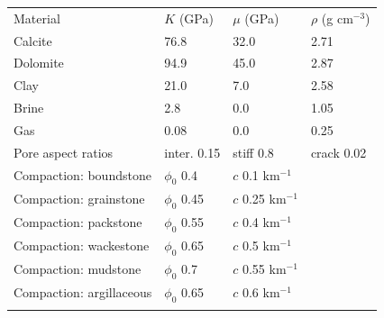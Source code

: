 \begin{tabular}{llll}
\tophline
Material & $K$ (GPa) & $\mu$ (GPa) & $\rho$ (g cm$^{-3}$) \\
\middlehline
Calcite & 76.8 & 32.0 & 2.71 \\
Dolomite & 94.9 & 45.0 & 2.87 \\
Clay & 21.0 & 7.0 & 2.58 \\
Brine & 2.8 & 0.0 & 1.05 \\
Gas & 0.08 & 0.0 & 0.25 \\
Pore aspect ratios & inter. 0.15 & stiff 0.8 & crack 0.02 \\
Compaction: boundstone & $\phi_0$ 0.4 & $c$ 0.1 km$^{-1}$ &  \\
Compaction: grainstone & $\phi_0$ 0.45 & $c$ 0.25 km$^{-1}$ &  \\
Compaction: packstone & $\phi_0$ 0.55 & $c$ 0.4 km$^{-1}$ &  \\
Compaction: wackestone & $\phi_0$ 0.65 & $c$ 0.5 km$^{-1}$ &  \\
Compaction: mudstone & $\phi_0$ 0.7 & $c$ 0.55 km$^{-1}$ &  \\
Compaction: argillaceous & $\phi_0$ 0.65 & $c$ 0.6 km$^{-1}$ &  \\
\bottomhline
\end{tabular}
